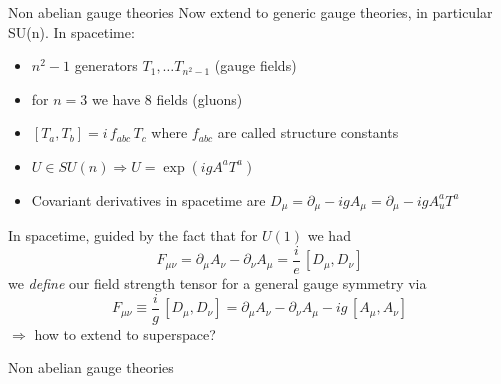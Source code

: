 \documentclass[10pt]{beamer}
\begin{document}
\begin{frame}{Non abelian gauge theories}
Now extend to generic gauge theories, in particular SU(n). In spacetime:
\begin{itemize}
    \item $n^2-1$ generators $T_{1}, \dots T_{n^2-1}$ (gauge fields)
    \item for $n=3$ we have 8 fields (gluons)
    \item $\left[T_a, T_b\right] = i \, f_{abc} \, T_c$ where $f_{abc}$ are called structure constants
    \item $U \in SU(n) \Rightarrow U = \exp(i g A^a T^a)$
    \item Covariant derivatives  in spacetime are $D_\mu = \partial_\mu - ig A_\mu = \partial_\mu - igA_u^a T^a$
\end{itemize}
In spacetime, guided by the fact that for $U(1)$ we had $$F_{\mu\nu} = \partial_\mu A_\nu - \partial_\nu A_\mu = \frac{i}{e} \, [D_\mu, D_\nu]$$
we \emph{define} our field strength tensor for a general gauge symmetry via 
\begin{equation*} 
    F_{\mu \nu} \equiv \frac{i}{g} \, [D_\mu, D_\nu] = \partial_\mu A_\nu - \partial_\nu A_\mu -ig \, [A_\mu, A_\nu]
\end{equation*}
$\Rightarrow$ how to extend to superspace?
\end{frame}

\begin{frame}{Non abelian gauge theories}
    
\end{frame}
\end{document}
